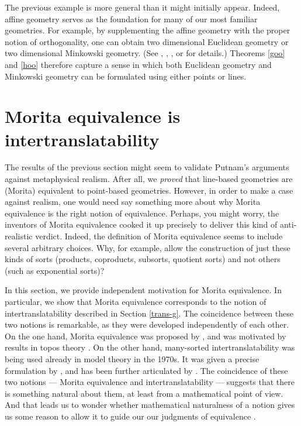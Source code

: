 The previous example is more general than it might initially appear.
Indeed, affine geometry serves as the foundation for many of our most
familiar geometries. For example, by supplementing the affine geometry
with the proper notion of orthogonality, one can obtain two
dimensional Euclidean geometry or two dimensional Minkowski geometry.
(See \cite{coxeter1955}, \cite{szczerba1979},
\citet[p.~910]{szczerba1986}, or \cite{goldblatt1987} for details.)
Theorems \ref{goo} and \ref{hoo} therefore capture a sense in which
both Euclidean geometry and Minkowski geometry can be formulated using
either points or lines.



\section{Morita equivalence is intertranslatability}

The results of the previous section might seem to validate Putnam's
arguments against metaphysical realism.  After all, we {\it proved}
that line-based geometries are (Morita) equivalent to point-based
geometries.  However, in order to make a case against realism, one
would need say something more about why Morita equivalence is the
right notion of equivalence.  Perhaps, you might worry, the inventors
of Morita equivalence cooked it up precisely to deliver this kind of
anti-realistic verdict.  Indeed, the definition of Morita equivalence
seems to include several arbitrary choices.  Why, for example, allow
the construction of just these kinds of sorts (products, coproducts,
subsorts, quotient sorts) and not others (such as exponential sorts)?

In this section, we provide independent motivation for Morita
equivalence.  In particular, we show that Morita equivalence
corresponds to the notion of intertranslatability described in Section
\ref{trans-g}.  The coincidence between these two notions is
remarkable, as they were developed independently of each other.  On
the one hand, Morita equivalence was proposed by \cite{barrett2015a},
and was motivated by results in topos theory \citep[see][]{johnstone}.
On the other hand, many-sorted intertranslatability was being used
already in model theory in the 1970s.  It was given a precise
formulation by \cite{van1984}, and has been further articulated by
\cite{snafu}.  The coincidence of these two notions --- Morita
equivalence and intertranslatability --- suggests that there is
something natural about them, at least from a mathematical point of
view.  And that leads us to wonder whether mathematical naturalness of
a notion gives us some reason to allow it to guide our our judgments
of equivalence \citep[see][]{dewar-int}.

